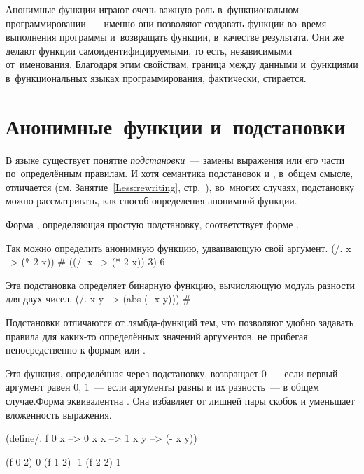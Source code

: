 Анонимные функции играют очень важную роль в~функциональном программировании~--- именно они позволяют создавать функции во~время выполнения программы и~возвращать функции, в~качестве результата. Они же делают функции самоидентифицируемыми, то есть, независимыми от~именования. Благодаря этим свойствам, граница между данными и~функциями в~функциональных языках программирования, фактически, стирается. 

\section{Анонимные~функции и~подстановки}%
В языке \Scheme существует понятие \emph{подстановки}~--- замены выражения или его части по~определённым правилам. И хотя семантика подстановок и , в~общем смысле, отличается (см. Занятие~\ref{Less:rewriting}, стр.~\pageref{Less:rewriting}), во~многих случаях, подстановку можно рассматривать, как способ определения анонимной функции.

Форма , определяющая простую подстановку, соответствует форме
. 

\begin{example}{%
Так можно определить анонимную функцию, удваивающую свой аргумент.}
\REPL
  {(/. x --> (* 2 x))}
  {\#<procedure:rewrite-all>}
\REPL
  {((/. x --> (* 2 x)) 3)}
  {6}
\end{example}
\begin{example}{%
Эта подстановка определяет бинарную функцию, вычисляющую модуль разности для двух чисел.}
\REPL
  {(/. x y --> (abs (- x y)))}
  {\#<procedure:rewrite-all>}
\end{example}
Подстановки отличаются от лямбда-функций тем, что позволяют удобно задавать правила для каких-то определённых значений аргументов, не прибегая непосредственно к формам  или .

\begin{example}{%
Эта функция, определённая через подстановку, возвращает 0~--- если первый аргумент равен 0, 1~--- если аргументы равны и их разность~--- в общем случае.\newline Форма  эквивалентна . Она избавляет от лишней пары скобок и уменьшает вложенность выражения.}
\begin{ExampleCode}
(define/. f 
  0 x --> 0
  x x --> 1
  x y --> (- x y))
\end{ExampleCode}

\REPL
  {(f 0 2)}
  {0}
\REPL
  {(f 1 2)}
  {-1}
\REPL
  {(f 2 2)}
  {1}
\end{example}

